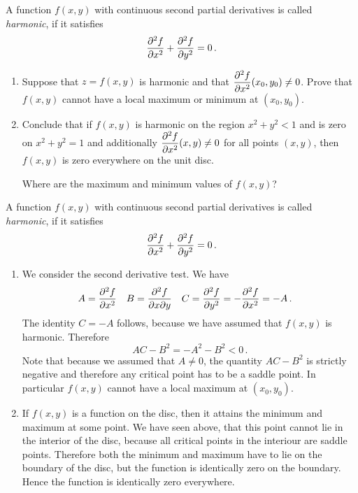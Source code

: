 \begin{question}
A function $f(x,y)$ with continuous second partial derivatives is called \emph{harmonic}, if it satisfies
\[
\frac{\partial^2 f}{\partial x^2} + \frac{\partial^2 f}{\partial y^2} = 0\,.
\]

\begin{enumerate}
\item
Suppose that $z=f(x,y)$ is harmonic and that $\displaystyle\frac{\partial^2 f}{\partial x^2}(x_0, y_0) \neq 0$. Prove that $f(x,y)$ cannot have a local maximum or minimum at $(x_0, y_0)$.
\item
Conclude that if $f(x,y)$ is harmonic on the region $x^2 + y^2 < 1$ and is zero on $x^2 + y^2 = 1$ and additionally $\displaystyle\frac{\partial^2 f}{\partial x^2}(x, y) \neq 0$ for all points $(x,y)$, then $f(x,y)$ is zero everywhere on the unit disc.

\begin{hint*}
Where are the maximum and minimum values of $f(x,y)$?
\end{hint*}
\end{enumerate}
\end{question}

\begin{solution}
A function $f(x,y)$ with continuous second partial derivatives is called \emph{harmonic}, if it satisfies
\[
\frac{\partial^2 f}{\partial x^2} + \frac{\partial^2 f}{\partial y^2} = 0\,.
\]

\begin{enumerate}
\item
We consider the second derivative test. We have
\begin{align*}
A &= \frac{\partial^2 f}{\partial x^2} &
B &= \frac{\partial^2 f}{\partial x \partial y} &
C &= \frac{\partial^2 f}{\partial y^2} = - \frac{\partial^2 f}{\partial x^2} = -A\,.
\end{align*}
The identity $C = -A$ follows, because we have assumed that $f(x,y)$ is harmonic. Therefore
\[
AC-B^2 = -A^2 - B^2 < 0\,.
\]
Note that because we assumed that $A \neq 0$, the quantity $AC-B^2$ is strictly negative and therefore any critical point has to be a saddle point. In particular $f(x,y)$ cannot have a local maximum at $(x_0,y_0)$.

\item
If $f(x,y)$ is a function on the disc, then it attains the minimum and maximum at some point. We have seen above, that this point cannot lie in the interior of the disc, because all critical points in the interiour are saddle points. Therefore both the minimum and maximum have to lie on the boundary of the disc, but the function is identically zero on the boundary. Hence the function is identically zero everywhere.
\end{enumerate}
\end{solution}

